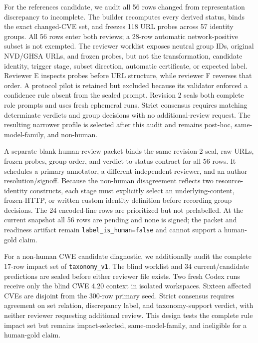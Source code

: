 For the references candidate, we audit all 56 rows changed from representation discrepancy to incomplete. The builder recomputes every derived status, binds the exact changed-CVE set, and freezes 118 URL probes across 57 identity groups. All 56 rows enter both reviews; a 28-row automatic network-positive subset is not exempted. The reviewer worklist exposes neutral group IDs, original NVD/GHSA URLs, and frozen probes, but not the transformation, candidate identity, trigger stage, subset direction, automatic certificate, or expected label. Reviewer E inspects probes before URL structure, while reviewer F reverses that order. A protocol pilot is retained but excluded because its validator enforced a confidence rule absent from the sealed prompt. Revision 2 seals both complete role prompts and uses fresh ephemeral runs. Strict consensus requires matching determinate verdicts and group decisions with no additional-review request. The resulting narrower profile is selected after this audit and remains post-hoc, same-model-family, and non-human.

A separate blank human-review packet binds the same revision-2 seal, raw URLs, frozen probes, group order, and verdict-to-status contract for all 56 rows. It schedules a primary annotator, a different independent reviewer, and an author resolution/signoff. Because the non-human disagreement reflects two resource-identity constructs, each stage must explicitly select an underlying-content, frozen-HTTP, or written custom identity definition before recording group decisions. The 24 encoded-line rows are prioritized but not prelabelled. At the current snapshot all 56 rows are pending and none is signed; the packet and readiness artifact remain \texttt{label\_is\_human=false} and cannot support a human-gold claim.

For a non-human CWE candidate diagnostic, we additionally audit the complete 17-row impact set of \texttt{taxonomy\_v1}. The blind worklist and 34 current/candidate predictions are sealed before either reviewer file exists. Two fresh Codex runs receive only the blind CWE 4.20 context in isolated workspaces. Sixteen affected CVEs are disjoint from the 300-row primary seed. Strict consensus requires agreement on set relation, discrepancy label, and taxonomy-support verdict, with neither reviewer requesting additional review. This design tests the complete rule impact set but remains impact-selected, same-model-family, and ineligible for a human-gold claim.


